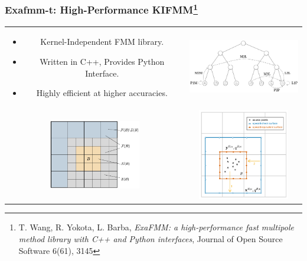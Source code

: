 \documentclass[dvipsnames,10pt]{beamer}
\begin{document}
\begin{frame}
    \frametitle{Exafmm-t: High-Performance KIFMM\footnote{\tiny T. Wang, R. Yokota, L. Barba, \textit{ExaFMM: a high-performance fast multipole method library with C++ and Python interfaces}, Journal of Open Source Software 6(61), 3145}}
    \vspace{-.1cm}
    \begin{center}
        \begin{tabular}{cc}
            \begin{minipage}{5cm}
                \begin{itemize}
                    \item Kernel-Independent FMM library.
                    \item Written in C++, Provides Python Interface.
                    \item Highly efficient at higher accuracies.
                \end{itemize}
            \end{minipage} &
            \includegraphics[width=5cm]{../figs/fmm_sketch.pdf} \\
            \includegraphics[width=4cm]{../figs/near_far_decomposition.pdf} &
            \includegraphics[width=4cm]{../figs/multipole_expansion.pdf}
        \end{tabular}
    \end{center}

\end{frame}
    
\end{document}
